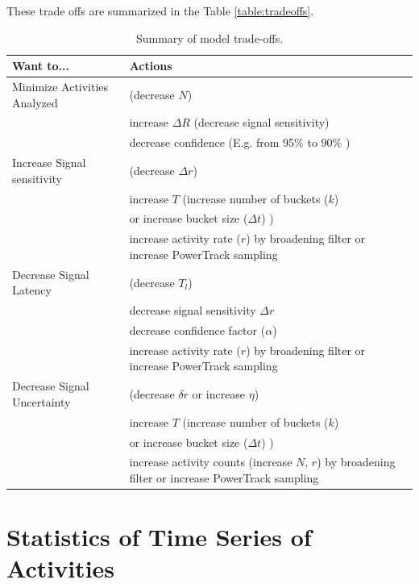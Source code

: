 \documentclass{article}
\begin{document}
These trade offs are summarized in the Table \ref{table:tradeoffs}.

\begin{table}
    \begin{tabular}{l| m{7cm}}
     \hline
Want to...  & Actions \\
\hline
Minimize Activities Analyzed   & (decrease $N$)  \\
                                  & increase $\Delta R$ (decrease signal sensitivity)  \\
                                  & decrease confidence (E.g. from 95\% to 90\% )  \\
\hline	
Increase Signal sensitivity   & (decrease $\Delta r$)  \\
                                  & increase $T$ (increase number of buckets ($k$)  \\
                                  & or increase bucket size ($\Delta t$) )  \\
                                  & increase activity rate ($r$) by broadening filter or increase PowerTrack sampling \\
\hline
Decrease Signal Latency      & (decrease $T_l$)  \\
                                 & decrease signal sensitivity $\Delta r$  \\
                                 & decrease confidence factor ($\alpha$) \\
                                 & increase activity rate ($r$) by broadening filter or increase PowerTrack sampling \\
\hline
Decrease Signal Uncertainty & (decrease $\delta r$ or increase $\eta$) \\
                          	  & increase $T$ (increase number of buckets ($k$)  \\
                                 & or increase bucket size ($\Delta t$) )  \\
                                 & increase activity counts (increase $N$, $r$) by broadening filter or increase PowerTrack sampling \\
\hline
\end{tabular}
\caption{Summary of model trade-offs.}
\label{tab:tradeoff}
\end{table}

\section{Statistics of Time Series of Activities}
\end{document}
